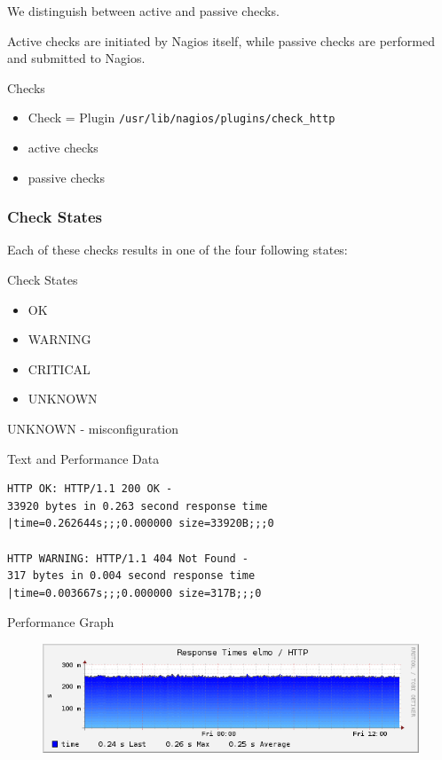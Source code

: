 We distinguish between active and passive checks.

Active checks are initiated by Nagios itself,
while passive checks are performed and submitted
to Nagios.

\begin{frame}[fragile]{Checks}
\begin{itemize}
\item Check = Plugin
\verb|/usr/lib/nagios/plugins/check_http|
\end{itemize}

\begin{itemize}
\item active checks
\item passive checks
\end{itemize}

\end{frame}

\subsubsection{Check States}

Each of these checks results in one of the four
following states:

\begin{frame}[fragile]{Check States}

\begin{itemize}
\item OK
\item WARNING 
\item CRITICAL
\item UNKNOWN
\end{itemize}
\end{frame}

UNKNOWN - misconfiguration

\begin{frame}[fragile]{Text and Performance Data}
\begin{lstlisting}
HTTP OK: HTTP/1.1 200 OK -
33920 bytes in 0.263 second response time
|time=0.262644s;;;0.000000 size=33920B;;;0

HTTP WARNING: HTTP/1.1 404 Not Found - 
317 bytes in 0.004 second response time 
|time=0.003667s;;;0.000000 size=317B;;;0
\end{lstlisting}
\end{frame}

\begin{frame}{Performance Graph}
\begin{figure}
\includegraphics[width=\textwidth]{images/perfdata.png}
\end{figure}
\end{frame}

